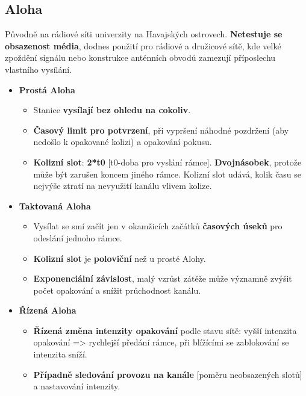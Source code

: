 \subsection{Aloha}
Původně na rádiové síti univerzity na Havajských ostrovech. \textbf{Netestuje se obsazenost média}, dodnes použití pro rádiové a družicové sítě, kde velké zpoždění signálu nebo konstrukce anténních obvodů zamezují příposlechu vlastního vysílání.

\begin{itemize}
    \item \textbf{Prostá Aloha}
          \begin{itemize}
              \item Stanice \textbf{vysílají bez ohledu na cokoliv}.
              \item \textbf{Časový limit pro potvrzení}, při vypršení náhodné pozdržení (aby nedošlo k opakované kolizi) a opakování pokusu.
              \item \textbf{Kolizní slot}: \textbf{2*t0} [t0-doba pro vyslání rámce]. \textbf{Dvojnásobek}, protože může být zarušen koncem jiného rámce. Kolizní slot udává, kolik času se nejvýše ztratí na nevyužití kanálu vlivem kolize.
          \end{itemize}

    \item \textbf{Taktovaná Aloha}
          \begin{itemize}
              \item Vysílat se smí začít jen v okamžicích začátků \textbf{časových úseků} pro odeslání jednoho rámce.
              \item \textbf{Kolizní slot} je \textbf{poloviční} než u prosté Alohy.
              \item \textbf{Exponenciální závislost}, malý vzrůst zátěže může významně zvýšit počet opakování a snížit průchodnost kanálu.
          \end{itemize}

    \item \textbf{Řízená Aloha}
          \begin{itemize}
              \item \textbf{Řízená změna intenzity opakování} podle stavu sítě: vyšší intenzita opakování => rychlejší předání rámce, při blížícími se zablokování se intenzita sníží.
              \item \textbf{Případně sledování provozu na kanále} [poměru neobsazených slotů] a nastavování intenzity.
          \end{itemize}
\end{itemize}

